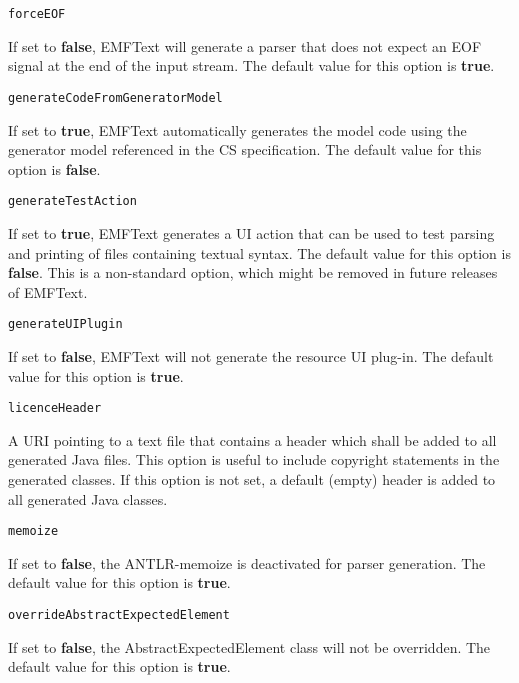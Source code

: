 \noindent\texttt{forceEOF}
\begin{myindentpar}{1cm}
If set to \textbf{false}, EMFText will generate a parser that does not expect an EOF signal at the end of the input stream. The default value for this option is \textbf{true}.
\end{myindentpar}

\noindent\texttt{generateCodeFromGeneratorModel}
\begin{myindentpar}{1cm}
If set to \textbf{true}, EMFText automatically generates the model code using the generator model referenced in the CS specification. The default value for this option is \textbf{false}.
\end{myindentpar}

\noindent\texttt{generateTestAction}
\begin{myindentpar}{1cm}
If set to \textbf{true}, EMFText generates a UI action that can be used to test parsing and printing of files containing textual syntax. The default value for this option is \textbf{false}. This is a non-standard option, which might be removed in future releases of EMFText.
\end{myindentpar}

\noindent\texttt{generateUIPlugin}
\begin{myindentpar}{1cm}
If set to \textbf{false}, EMFText will not generate the resource UI plug-in. The default value for this option is \textbf{true}.
\end{myindentpar}

\noindent\texttt{licenceHeader}
\begin{myindentpar}{1cm}
A URI pointing to a text file that contains a header which shall be added to all generated Java files. This option is useful to include copyright statements in the generated classes. If this option is not set, a default (empty) header is added to all generated Java classes.
\end{myindentpar}

\noindent\texttt{memoize}
\begin{myindentpar}{1cm}
If set to \textbf{false}, the ANTLR-memoize is deactivated for parser generation. The default value for this option is \textbf{true}.
\end{myindentpar}

\noindent\texttt{overrideAbstractExpectedElement}
\begin{myindentpar}{1cm}
If set to \textbf{false}, the AbstractExpectedElement class will not be overridden. The default value for this option is \textbf{true}.
\end{myindentpar}

